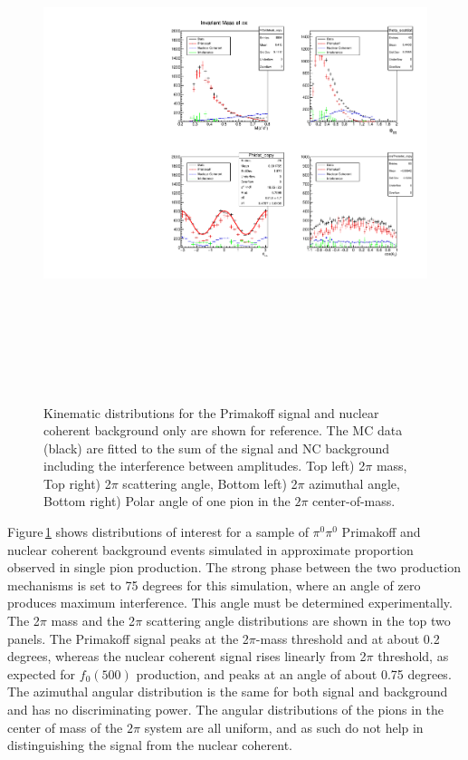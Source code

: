  \begin{figure}[tbp]
\begin{center}
\includegraphics[height=15cm,clip=true]{figures/twopi_primakoff_DSelect_test_File_100000_decomposition_PrimNC.pdf}
\caption{Kinematic distributions for the Primakoff signal and nuclear coherent background only are shown for reference. The MC data (black) are fitted to the sum of the signal and NC background including the interference between amplitudes. 
Top left) 2$\pi$ mass, Top right) 2$\pi$ scattering angle, Bottom left) 2$\pi$ azimuthal angle, 
Bottom right) Polar angle of one pion in the $2\pi$ center-of-mass.
\label{fig:decomposition_PrimNC}}
\end{center} 
\end{figure}

Figure\,\ref{fig:decomposition_PrimNC} shows distributions of interest for a sample of $\pi^0\pi^0$ Primakoff and
nuclear coherent background events simulated in approximate proportion observed in single pion production. The strong phase between the two production mechanisms is set to
75 degrees for this simulation, where an angle of zero produces maximum interference. This angle must be determined experimentally. 
The 2$\pi$ mass and the 2$\pi$ scattering angle distributions are shown in the top two panels. The Primakoff signal peaks at the 2$\pi$-mass threshold and at about 0.2 degrees, whereas the nuclear coherent signal rises linearly from 2$\pi$ threshold, as expected for $f_0(500)$ production, and peaks at an angle of about 0.75 degrees. The azimuthal angular distribution is the same for both signal and background and has no discriminating power. The angular distributions of the pions in
the center of mass of the $2\pi$ system are all uniform, and as such do not help in distinguishing the signal from the nuclear coherent.  

